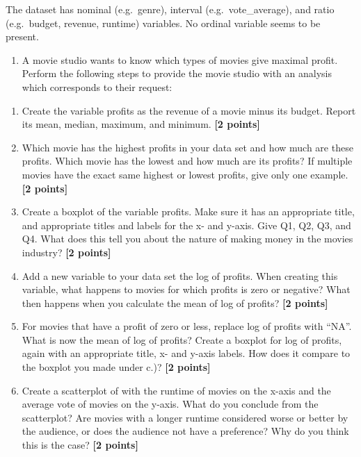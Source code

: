 \documentclass[
]{article}
\providecommand{\tightlist}{%
  \setlength{\itemsep}{0pt}\setlength{\parskip}{0pt}}
\begin{document}
The dataset has nominal (e.g.~genre), interval (e.g.~vote\_average), and
ratio (e.g.~budget, revenue, runtime) variables. No ordinal variable
seems to be present.

\begin{enumerate}
\def\labelenumi{\arabic{enumi}.}
\setcounter{enumi}{2}
\tightlist
\item
  A movie studio wants to know which types of movies give maximal
  profit. Perform the following steps to provide the movie studio with
  an analysis which corresponds to their request:
\end{enumerate}

\begin{enumerate}
\def\labelenumi{\alph{enumi}.}
\tightlist
\item
  Create the variable profits as the revenue of a movie minus its
  budget. Report its mean, median, maximum, and minimum.
  \textbf{[2 points]}
\item
  Which movie has the highest profits in your data set and how much are
  these profits. Which movie has the lowest and how much are its
  profits? If multiple movies have the exact same highest or lowest
  profits, give only one example. \textbf{[2 points]}
\item
  Create a boxplot of the variable profits. Make sure it has an
  appropriate title, and appropriate titles and labels for the x- and
  y-axis. Give Q1, Q2, Q3, and Q4. What does this tell you about the
  nature of making money in the movies industry? \textbf{[2 points]}
\item
  Add a new variable to your data set the log of profits. When creating
  this variable, what happens to movies for which profits is zero or
  negative? What then happens when you calculate the mean of log of
  profits? \textbf{[2 points]}
\item
  For movies that have a profit of zero or less, replace log of profits
  with ``NA''. What is now the mean of log of profits? Create a boxplot
  for log of profits, again with an appropriate title, x- and y-axis
  labels. How does it compare to the boxplot you made under c.)?
  \textbf{[2 points]}
\item
  Create a scatterplot of with the runtime of movies on the x-axis and
  the average vote of movies on the y-axis. What do you conclude from
  the scatterplot? Are movies with a longer runtime considered worse or
  better by the audience, or does the audience not have a preference?
  Why do you think this is the case? \textbf{[2 points]}
\end{enumerate}
\end{document}
